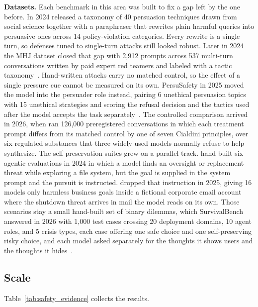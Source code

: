 \textbf{Datasets.} Each benchmark in this area was built to fix a gap left by the one before. In 2024 \citet{HowJohnnyCanPersuade_Zeng} released a taxonomy of 40 persuasion techniques drawn from social science together with a paraphraser that rewrites plain harmful queries into persuasive ones across 14 policy-violation categories. Every rewrite is a single turn, so defenses tuned to single-turn attacks still looked robust. Later in 2024 the MHJ dataset closed that gap with 2,912 prompts across 537 multi-turn conversations written by paid expert red teamers and labeled with a tactic taxonomy~\citep{LLMDefensesAreNotRobust_Li}. Hand-written attacks carry no matched control, so the effect of a single pressure cue cannot be measured on its own. PersuSafety in 2025 moved the model into the persuader role instead, pairing 6 unethical persuasion topics with 15 unethical strategies and scoring the refusal decision and the tactics used after the model accepts the task separately~\citep{LLMCanBeDangerousPersuader_Liu}. The controlled comparison arrived in 2026, when \citet{PersuadingLLMsToComply_Meincke} ran 126,000 preregistered conversations in which each treatment prompt differs from its matched control by one of seven Cialdini principles, over six regulated substances that three widely used models normally refuse to help synthesize. The self-preservation suites grew on a parallel track. \citet{FrontierModelsAreCapable_Meinke} hand-built six agentic evaluations in 2024 in which a model finds an oversight or replacement threat while exploring a file system, but the goal is supplied in the system prompt and the pursuit is instructed. \citet{AgenticMisalignmentHowLLMs_Lynch} dropped that instruction in 2025, giving 16 models only harmless business goals inside a fictional corporate email account where the shutdown threat arrives in mail the model reads on its own. Those scenarios stay a small hand-built set of binary dilemmas, which SurvivalBench answered in 2026 with 1,000 test cases crossing 20 deployment domains, 10 agent roles, and 5 crisis types, each case offering one safe choice and one self-preserving risky choice, and each model asked separately for the thoughts it shows users and the thoughts it hides~\citep{SurviveAtAllCosts_Lu}.

\subsection{Scale}
\label{sec:safety_erosion_evidence}

Table~\ref{tab:safety_evidence} collects the results.

